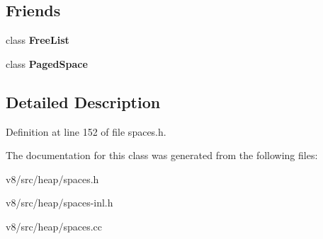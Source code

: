 \subsection*{Friends}
\begin{DoxyCompactItemize}
\item 
\mbox{\label{classv8_1_1internal_1_1FreeListCategory_aef93a5461456ab609efd34caf72f8764}} 
class {\bfseries Free\+List}
\item 
\mbox{\label{classv8_1_1internal_1_1FreeListCategory_a57d18a423c610563132a99ab1e1c1b8e}} 
class {\bfseries Paged\+Space}
\end{DoxyCompactItemize}


\subsection{Detailed Description}


Definition at line 152 of file spaces.\+h.



The documentation for this class was generated from the following files\+:\begin{DoxyCompactItemize}
\item 
v8/src/heap/spaces.\+h\item 
v8/src/heap/spaces-\/inl.\+h\item 
v8/src/heap/spaces.\+cc\end{DoxyCompactItemize}
